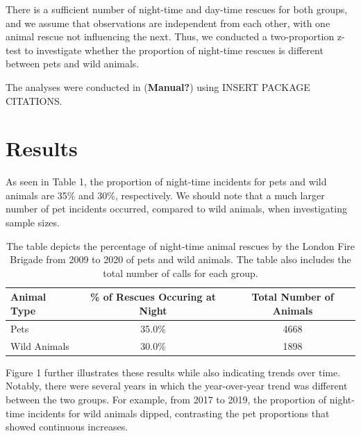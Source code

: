 \documentclass[
]{article}
\begin{document}
There is a sufficient number of night-time and day-time rescues for both
groups, and we assume that observations are independent from each other,
with one animal rescue not influencing the next. Thus, we conducted a
two-proportion z-test to investigate whether the proportion of
night-time rescues is different between pets and wild animals.

The analyses were conducted in (\textbf{Manual?}) using INSERT PACKAGE
CITATIONS.

\hypertarget{results}{%
\section{Results}\label{results}}

As seen in Table 1, the proportion of night-time incidents for pets and
wild animals are 35\% and 30\%, respectively. We should note that a much
larger number of pet incidents occurred, compared to wild animals, when
investigating sample sizes.

\hypertarget{tbl-night-summary}{}
\begin{table}
\caption{\label{tbl-night-summary}The table depicts the percentage of night-time animal rescues by the
London Fire Brigade from 2009 to 2020 of pets and wild animals. The
table also includes the total number of calls for each group. }\tabularnewline

\centering
\begin{tabular}[t]{lcc}
\toprule
Animal Type & \% of Rescues Occuring at Night & Total Number of Animals\\
\midrule
Pets & 35.0\% & 4668\\
Wild Animals & 30.0\% & 1898\\
\bottomrule
\end{tabular}
\end{table}

Figure 1 further illustrates these results while also indicating trends
over time. Notably, there were several years in which the year-over-year
trend was different between the two groups. For example, from 2017 to
2019, the proportion of night-time incidents for wild animals dipped,
contrasting the pet proportions that showed continuous increases.
\end{document}
